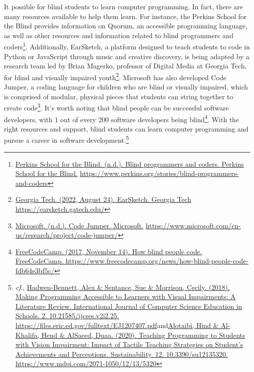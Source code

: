 {{It possible for blind students to learn computer programming. In fact, there are many resources available to help them learn. For instance, the Perkins School for the Blind provides information on Quorum, an accessible programming language, as well as other resources and information related to blind programmers and coders\footnote{\raggedright \href{https://www.perkins.org/stories/blind-programmers-and-coders}{Perkins School for the Blind. (n.d.). Blind programmers and coders. Perkins School for the Blind.} \url{https://www.perkins.org/stories/blind-programmers-and-coders}}. Additionally, EarSketch, a platform designed to teach students to code in Python or JavaScript through music and creative discovery, is being adapted by a research team led by Brian Magerko, professor of Digital Media at Georgia Tech, for blind and visually impaired youth\footnote{\raggedright \href{https://earsketch.gatech.edu/}{Georgia Tech. (2022, August 24). EarSketch. Georgia Tech} \break\url{https://earsketch.gatech.edu/}}. Microsoft has also developed Code Jumper, a coding language for children who are blind or visually impaired, which is comprised of modular, physical pieces that students can string together to create code\footnote{\raggedright \href{https://www.microsoft.com/en-us/research/project/code-jumper/}{Microsoft. (n.d.). Code Jumper. Microsoft.} \break\url{https://www.microsoft.com/en-us/research/project/code-jumper/}}. It’s worth noting that blind people can be successful software developers, with 1 out of every 200 software developers being blind\footnote{\raggedright \href{https://www.freecodecamp.org/news/how-blind-people-code-fdb64e3bf5c/}{FreeCodeCamp. (2017, November 14). How blind people code. FreeCodeCamp. } \break\url{https://www.freecodecamp.org/news/how-blind-people-code-fdb64e3bf5c/}}. With the right resources and support, blind students can learn computer programming and pursue a career in software development.\footnote{\raggedright \textit{cf}., \href{https://files.eric.ed.gov/fulltext/EJ1207407.pdf}{Hadwen-Bennett, Alex \& Sentance, Sue \& Morrison, Cecily. (2018). Making Programming Accessible to Learners with Visual Impairments: A Literature Review. International Journal of Computer Science Education in Schools. 2. 10.21585/ijcses.v2i2.25.} \break\url{https://files.eric.ed.gov/fulltext/EJ1207407.pdf}\break and\break \href{https://www.mdpi.com/2071-1050/12/13/5320}{Alotaibi, Hind \& Al-Khalifa, Hend \& AlSaeed, Duaa. (2020). Teaching Programming to Students with Vision Impairment: Impact of Tactile Teaching Strategies on Student’s Achievements and Perceptions. Sustainability. 12. 10.3390/su12135320.} \url{https://www.mdpi.com/2071-1050/12/13/5320}}

}}
